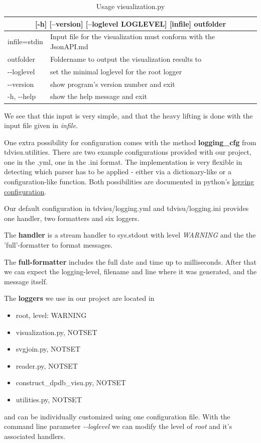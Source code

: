 \documentclass[a4paper, 12pt]{scrartcl}
\begin{document}
\def\arraystretch{1.2}%
\begin{longtable}{|ll|}
	\caption{Usage visualization.py 
		\label{tab:optionstdvisu}}\\
	\hline 
	\multicolumn{2}{|c|}{[-h] [--version] [--loglevel LOGLEVEL] [infile] outfolder}
	\\[2ex]
	\endfirsthead

	infile=stdin &  Input file for the visualization must conform with the JsonAPI.md\\
	outfolder &  Foldername to output the visualization results to\\
	-{}-loglevel  &   set the minimal loglevel for the root logger\\
	-{}-version & show program's version number and exit\\
	-h, -{}-help & show the help message and exit\\
	\hline
\end{longtable}

We see that this input is very simple, and that the heavy lifting is done with the input file given in \textit{infile}.

One extra possibility for configuration comes with the method \textbf{logging\_cfg} from {tdvisu.utilities}. There are two example configurations provided with our project, one in the .yml, one in the .ini format. The implementation is very flexible in detecting which parser has to be applied - either via a dictionary-like or a configuration-like function. Both possibilities are documented in python's \href{https://docs.python.org/3/library/logging.config.html#logging-config-api}{logging configuration}.

Our default configuration in tdvisu/logging.yml and tdvisu/logging.ini provides one handler, two formatters and six loggers.

The \textbf{handler} is a stream handler to sys.stdout with level \textit{WARNING} and the the 'full'-formatter to format messages.

The \textbf{full-formatter} includes the full date and time up to milliseconds. After that we can expect the logging-level, filename and line where it was generated, and the message itself.

The \textbf{loggers} we use in our project are located in 
\begin{itemize}
	\item root, level: WARNING
	\item visualization.py, NOTSET
	\item svgjoin.py, NOTSET
    \item reader.py, NOTSET
	\item construct\_dpdb\_visu.py, NOTSET
	\item utilities.py, NOTSET
\end{itemize}
and can be individually customized using one configuration file.
With the command line parameter \textit{-{}-loglevel} we can modify the level of \textit{root} and it's associated handlers.
\end{document}
